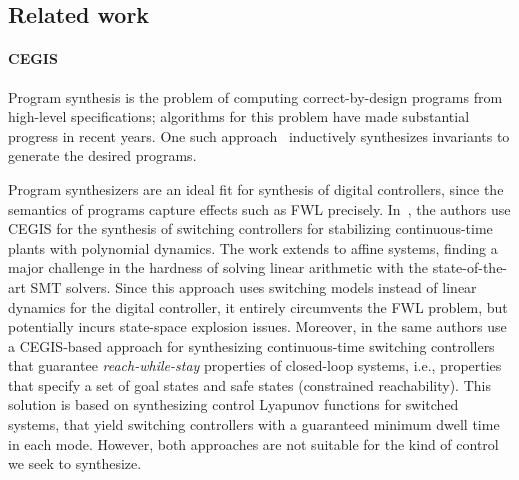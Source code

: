 \documentclass[runningheads,a4paper]{llncs}
\begin{document}


\subsection*{Related work}

\paragraph{CEGIS}

Program synthesis is the problem of computing correct-by-design programs
from high-level specifications; algorithms for this problem have made
substantial progress in recent years.  One such
approach~\cite{itzhaky2010simple} inductively synthesizes invariants to
generate the desired programs.

Program synthesizers are an ideal fit for synthesis of %
digital controllers, since the semantics of programs capture effects such as
FWL precisely.  In~\cite{DBLP:conf/cdc/RavanbakhshS15}, the authors use
CEGIS for the synthesis of switching controllers for stabilizing
continuous-time plants with polynomial dynamics.  The work extends to affine
systems, finding a major challenge in the hardness of solving linear
arithmetic with the state-of-the-art SMT solvers.  Since this approach uses
switching models instead of linear dynamics for the digital controller, it
entirely circumvents the FWL problem, but potentially incurs state-space
explosion issues.  Moreover, in \cite{DBLP:conf/emsoft/RavanbakhshS16} the
same authors use a CEGIS-based approach for synthesizing continuous-time
switching controllers that guarantee \emph{reach-while-stay} properties of
closed-loop systems, i.e., properties that specify a set of goal states and
safe states (constrained reachability).  This solution is based on
synthesizing control Lyapunov functions for switched systems, that yield
switching controllers with a guaranteed minimum dwell time in each mode. 
However, both approaches are not suitable for the kind of control we seek to
synthesize.
\end{document}
